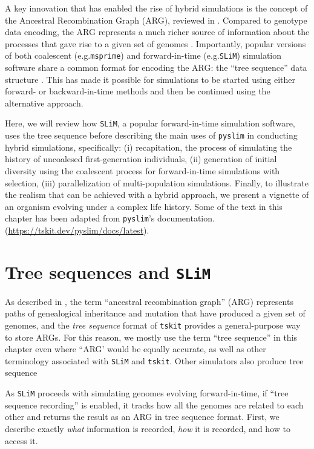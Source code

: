 \documentclass[12pt]{article}
\newcommand{\msprime}[0]{\texttt{msprime}\xspace}
\newcommand{\tskit}[0]{\texttt{tskit}\xspace}
\newcommand{\slim}[0]{\texttt{SLiM}\xspace}
\newcommand{\pyslim}[0]{\texttt{pyslim}\xspace}
\newcommand*{\eg}{e.g.\xcomma}
\begin{document}

A key innovation that has enabled the rise of hybrid simulations is the concept of the Ancestral Recombination Graph (ARG), reviewed in \citet{wong_general_2024}.
Compared to genotype data encoding, the ARG represents a much richer source of information about the processes that gave rise to a given set of genomes \citep{kelleher_efficient_2016}.
Importantly, popular versions of both coalescent (\eg \msprime) and forward-in-time (\eg \slim) simulation software share a common format for
encoding the ARG: the ``tree sequence'' data structure \citep{baumdicker_efficient_2022, haller_tree-sequence_2019}.
This has made it possible for simulations to be started using either forward- or backward-in-time
methods and then be continued using the alternative approach.

Here, we will review how \slim, a popular forward-in-time simulation software, uses the tree sequence before describing
the main uses of \pyslim in conducting hybrid simulations, specifically:
(i) recapitation, the process of simulating the history of uncoalesed first-generation individuals,
(ii) generation of initial diversity using the coalescent process for forward-in-time simulations with selection,
(iii) parallelization of multi-population simulations.
Finally, to illustrate the realism that can be achieved with a hybrid approach, we present a vignette of an organism evolving under a complex life history.
Some of the text in this chapter has been adapted from \pyslim's documentation.
(\url{https://tskit.dev/pyslim/docs/latest}).

\section{Tree sequences and \slim}
As described in \citet{wong_general_2024}, the term ``ancestral recombination graph'' (ARG)
represents paths of genealogical inheritance and mutation that have produced a given set of genomes,
and the \emph{tree sequence} format of \tskit provides a general-purpose way to store ARGs.
For this reason, we mostly use the term ``tree sequence'' in this chapter even where ``ARG'
would be equally accurate, as well as other terminology associated with \slim and \tskit \citep{kelleher_efficient_2016,ralph_efficiently_2020,wong_general_2024}.
Other simulators also produce tree sequence

As \slim proceeds with simulating genomes evolving forward-in-time, 
if ``tree sequence recording'' is enabled,
it tracks how all the genomes are
related to each other and returns the result as an ARG in tree sequence format. First, we describe
exactly \emph{what} information is recorded, \emph{how} it is recorded, and how to access it.
\end{document}
